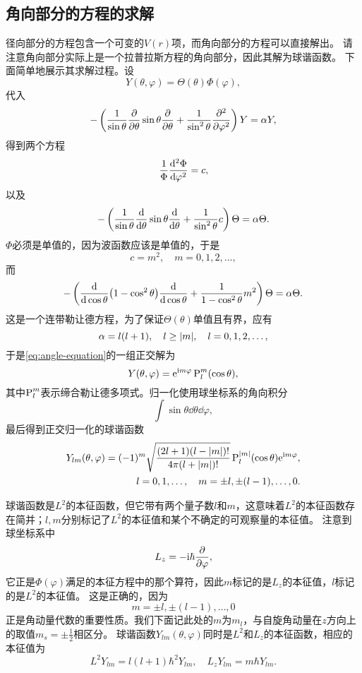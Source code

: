 \subsection{角向部分的方程的求解}

径向部分的方程包含一个可变的$V(r)$项，而角向部分的方程可以直接解出。
请注意角向部分实际上是一个拉普拉斯方程的角向部分，因此其解为球谐函数。
下面简单地展示其求解过程。设
\[
    Y(\theta, \varphi) = \Theta(\theta) \Phi(\varphi),
\]
代入
\[
    - \left( \frac{1}{\sin \theta} \pdv{\theta} \sin \theta \pdv{\theta} + \frac{1}{\sin^2 \theta} \pdv[2]{\varphi} \right) Y = \alpha Y,
\]
得到两个方程
\[
    \frac{1}{\Phi} \dv[2]{\Phi}{\varphi} = c,
\]
以及
\[
    - \left( \frac{1}{\sin \theta} \dv{\theta} \sin \theta \dv{\theta} + \frac{1}{\sin^2 \theta} c \right) \Theta = \alpha \Theta.
\]
$\Phi$必须是单值的，因为波函数应该是单值的，于是
\[
    c = m^2, \quad m = 0, 1, 2, \ldots,
\]
而
\[
    - \left( \dv{\cos \theta} (1 - \cos^2 \theta) \dv{\cos \theta} + \frac{1}{1 - \cos^2 \theta} m^2 \right) \Theta = \alpha \Theta.
\]
这是一个连带勒让德方程，为了保证$\Theta(\theta)$单值且有界，应有
\[
    \alpha = l(l+1), \quad l \geq \abs{m}, \quad l = 0, 1, 2, \ldots,
\]
于是\eqref{eq:angle-equation}的一组正交解为
\[
    Y(\theta, \varphi) = \mathrm{e}^{\mathrm{i} m \varphi} \operatorname{P}_l^m(\cos \theta),
\]
其中$\operatorname{P}_l^m$表示缔合勒让德多项式。归一化使用球坐标系的角向积分
\[
    \int \sin \theta \dd{\theta} \dd{\varphi},
\]
最后得到正交归一化的球谐函数
\begin{equation}
    \begin{split}
        Y_{lm}(\theta, \varphi) = (-1)^m \sqrt{\frac{(2l+1)(l-\abs{m})!}{4\pi (l+\abs{m})!}} \operatorname{P}_l^\abs{m} (\cos \theta) \mathrm{e}^{\mathrm{i} m \varphi}, \\
        l = 0, 1, \ldots, \quad m = \pm l, \pm (l-1), \ldots, 0 .
    \end{split}
\end{equation}

球谐函数是${L}^2$的本征函数，但它带有两个量子数$l$和$m$，这意味着${L}^2$的本征函数存在简并；$l,m$分别标记了${L}^2$的本征值和某个不确定的可观察量的本征值。
注意到球坐标系中
\[
    {L}_z = - \mathrm{i} \hbar \pdv{\varphi},
\]
它正是$\Phi(\varphi)$满足的本征方程中的那个算符，因此$m$标记的是${L}_z$的本征值，$l$标记的是${L}^2$的本征值。
这是正确的，因为
\[
    m = \pm l, \pm (l-1), \ldots, 0
\]
正是角动量代数的重要性质。我们下面记此处的$m$为$m_l$，与自旋角动量在$z$方向上的取值$m_s = \pm \frac{1}{2}$相区分。
球谐函数$Y_{lm}(\theta, \varphi)$同时是${L}^2$和$L_z$的本征函数，相应的本征值为
\begin{equation}
    {L}^2 Y_{lm} = l(l+1) \hbar^2 Y_{lm}, \quad {L}_z Y_{lm} = m \hbar Y_{lm}.
    \label{eq:orbital-angular-momentum}
\end{equation}

